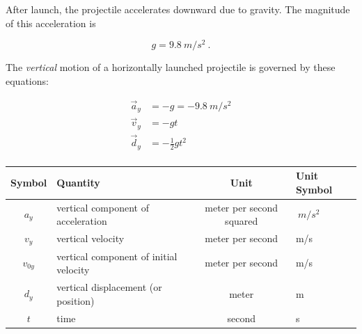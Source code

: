 \documentclass[main.tex]{subfiles}
\begin{document}
\begin{mdframed}[backgroundcolor=black!10]
After launch, the projectile accelerates downward due to gravity. The magnitude of this acceleration is

\begin{equation*}
    g = \SI{9.8}{m/s^2}\ .
\end{equation*}
\end{mdframed}

\begin{mdframed}[backgroundcolor=black!10]
The \textit{vertical} motion of a horizontally launched projectile is governed by these equations:
\vspace{-1em}

\begin{align*}
    \vec{a}_y &= -g = -\SI{9.8}{m/s^2}\\
    \vec{v}_y &= - gt\\
    \vec{d}_y &= -\frac{1}{2} g t^2\\
\end{align*}
\vspace{-3em}

\begin{center}
    \begin{tabular}{cl|cl}
    \hline
    \textbf{Symbol} & \textbf{Quantity} & \textbf{Unit} & \textbf{Unit Symbol}  \\
    \hline\hline
        $a_y$ & vertical component of acceleration & meter per second squared & $\SI{}{m/s^2}$\\
        $v_y$ & vertical velocity & meter per second & m/s\\
        $v_{0y}$ & vertical component of initial velocity & meter per second & m/s\\
        $d_y$ & vertical displacement (or position) & meter & m\\
        $t$ & time & second & s\\
    \hline
    \end{tabular}
\end{center}
\end{mdframed}




\end{document}
